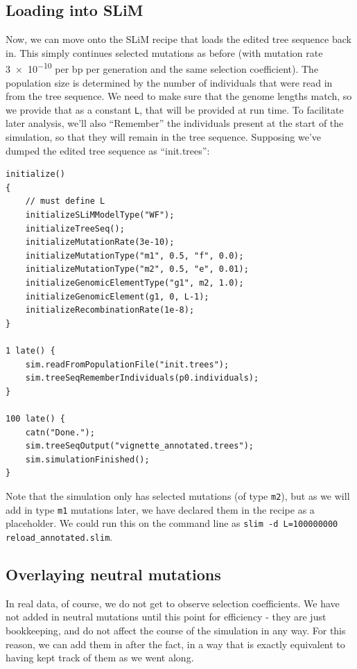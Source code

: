 \documentclass[12pt]{article}
\begin{document}
\subsection*{Loading into SLiM}

Now, we can move onto the SLiM recipe
that loads the edited tree sequence back in.
This simply continues selected mutations as before
(with mutation rate \num{3e-10} per bp per generation and the same selection coefficient).
The population size is determined by the number of individuals
that were read in from the tree sequence.
We need to make sure that the genome lengths match,
so we provide that as a constant \verb|L|, that will be provided at run time.
To facilitate later analysis,
we’ll also ``Remember'' the individuals present at the start of the simulation,
so that they will remain in the tree sequence.
Supposing we've dumped the edited tree sequence as ``init.trees'':
\begin{lstlisting}[language=slim]
initialize()
{
    // must define L
    initializeSLiMModelType("WF");
    initializeTreeSeq();
    initializeMutationRate(3e-10);
    initializeMutationType("m1", 0.5, "f", 0.0);
    initializeMutationType("m2", 0.5, "e", 0.01);
    initializeGenomicElementType("g1", m2, 1.0);
    initializeGenomicElement(g1, 0, L-1);
    initializeRecombinationRate(1e-8);
}

1 late() { 
    sim.readFromPopulationFile("init.trees");
    sim.treeSeqRememberIndividuals(p0.individuals);
}

100 late() {
    catn("Done.");
    sim.treeSeqOutput("vignette_annotated.trees");
    sim.simulationFinished();
}
\end{lstlisting}

Note that the simulation only has selected mutations (of type \verb|m2|),
but as we will add in type \verb|m1| mutations later,
we have declared them in the recipe as a placeholder.
We could run this on the command line as \verb|slim -d L=100000000 reload_annotated.slim|.


\subsection*{Overlaying neutral mutations}

In real data, of course, we do not get to observe selection coefficients.
We have not added in neutral mutations until this point for efficiency - they are just bookkeeping,
and do not affect the course of the simulation in any way.
For this reason, we can add them in after the fact,
in a way that is exactly equivalent to having kept track of them as we went along.
\end{document}
